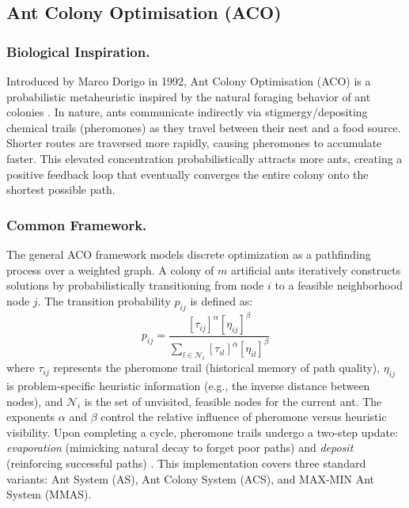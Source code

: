 \subsection{Ant Colony Optimisation (ACO)}

\subsubsection{Biological Inspiration.}
Introduced by Marco Dorigo in 1992, Ant Colony Optimisation (ACO) is a probabilistic metaheuristic inspired by the natural foraging behavior of ant colonies \autocite{DorigoBirattariStutzle2007}. In nature, ants communicate indirectly via stigmergy/depositing chemical trails (pheromones) as they travel between their nest and a food source. Shorter routes are traversed more rapidly, causing pheromones to accumulate faster. This elevated concentration probabilistically attracts more ants, creating a positive feedback loop that eventually converges the entire colony onto the shortest possible path.

\subsubsection{Common Framework.}
The general ACO framework models discrete optimization as a pathfinding process over a weighted graph. A colony of $m$ artificial ants iteratively constructs solutions by probabilistically transitioning from node $i$ to a feasible neighborhood node $j$. The transition probability $p_{ij}$ is defined as:
\begin{equation}
    p_{ij} = \frac{[\tau_{ij}]^\alpha [\eta_{ij}]^\beta}{\sum_{l \in \mathcal{N}_i} [\tau_{il}]^\alpha [\eta_{il}]^\beta}
\end{equation}
where $\tau_{ij}$ represents the pheromone trail (historical memory of path quality), $\eta_{ij}$ is problem-specific heuristic information (e.g., the inverse distance between nodes), and $\mathcal{N}_i$ is the set of unvisited, feasible nodes for the current ant. The exponents $\alpha$ and $\beta$ control the relative influence of pheromone versus heuristic visibility. Upon completing a cycle, pheromone trails undergo a two-step update: \textit{evaporation} (mimicking natural decay to forget poor paths) and \textit{deposit} (reinforcing successful paths) \autocite{DorigoBirattariStutzle2007}. This implementation covers three standard variants: Ant System (AS), Ant Colony System (ACS), and MAX-MIN Ant System (MMAS).

